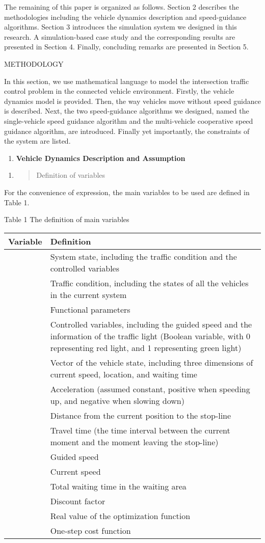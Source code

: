 The remaining of this paper is organized as follows. Section 2 describes
the methodologies including the vehicle dynamics description and
speed-guidance algorithms. Section 3 introduces the simulation system we
designed in this research. A simulation-based case study and the
corresponding results are presented in Section 4. Finally, concluding
remarks are presented in Section 5.

METHODOLOGY

In this section, we use mathematical language to model the intersection
traffic control problem in the connected vehicle environment. Firstly,
the vehicle dynamics model is provided. Then, the way vehicles move
without speed guidance is described. Next, the two speed-guidance
algorithms we designed, named the single-vehicle speed guidance
algorithm and the multi-vehicle cooperative speed guidance algorithm,
are introduced. Finally yet importantly, the constraints of the system
are listed.

\begin{enumerate}
\def\labelenumi{\arabic{enumi}.}
\item
  \textbf{Vehicle Dynamics Description and Assumption}
\end{enumerate}

\begin{enumerate}
\def\labelenumi{\arabic{enumi})}
\item
  \begin{quote}
  Definition of variables
  \end{quote}
\end{enumerate}

For the convenience of expression, the main variables to be used are
defined in Table 1.

Table 1 The definition of main variables

\begin{longtable}[c]{@{}ll@{}}
\toprule
Variable & Definition\tabularnewline
\midrule
\endhead
& System state, including the traffic condition and the controlled
variables\tabularnewline
& Traffic condition, including the states of all the vehicles in the
current system\tabularnewline
& Functional parameters\tabularnewline
& Controlled variables, including the guided speed and the information
of the traffic light (Boolean variable, with 0 representing red light,
and 1 representing green light)\tabularnewline
& Vector of the vehicle state, including three dimensions of current
speed, location, and waiting time\tabularnewline
& Acceleration (assumed constant, positive when speeding up, and
negative when slowing down)\tabularnewline
& Distance from the current position to the stop-line\tabularnewline
& Travel time (the time interval between the current moment and the
moment leaving the stop-line)\tabularnewline
& Guided speed\tabularnewline
& Current speed\tabularnewline
& Total waiting time in the waiting area\tabularnewline
& Discount factor\tabularnewline
& Real value of the optimization function\tabularnewline
& One-step cost function\tabularnewline
\bottomrule
\end{longtable}


